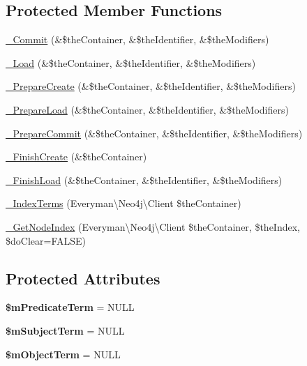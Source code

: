 \subsection*{Protected Member Functions}
\begin{DoxyCompactItemize}
\item 
\hyperlink{class_c_ontology_edge_a76e551f21dcac3c0bc228c67226bec08}{\-\_\-\-Commit} (\&\$the\-Container, \&\$the\-Identifier, \&\$the\-Modifiers)
\item 
\hyperlink{class_c_ontology_edge_ae7a4861887c1a73dcdbd0285cdba1d8d}{\-\_\-\-Load} (\&\$the\-Container, \&\$the\-Identifier, \&\$the\-Modifiers)
\item 
\hyperlink{class_c_ontology_edge_a1d09b3ef8e4ef57a072291a7c09f7371}{\-\_\-\-Prepare\-Create} (\&\$the\-Container, \&\$the\-Identifier, \&\$the\-Modifiers)
\item 
\hyperlink{class_c_ontology_edge_a6099442ba1dca683e4832d406793b5b9}{\-\_\-\-Prepare\-Load} (\&\$the\-Container, \&\$the\-Identifier, \&\$the\-Modifiers)
\item 
\hyperlink{class_c_ontology_edge_a2bea996dff6e836069d75572f9386039}{\-\_\-\-Prepare\-Commit} (\&\$the\-Container, \&\$the\-Identifier, \&\$the\-Modifiers)
\item 
\hyperlink{class_c_ontology_edge_a0956d5920484a329c77d878bb6c25784}{\-\_\-\-Finish\-Create} (\&\$the\-Container)
\item 
\hyperlink{class_c_ontology_edge_ac45af3396c797be599c2a1780b7bfa59}{\-\_\-\-Finish\-Load} (\&\$the\-Container, \&\$the\-Identifier, \&\$the\-Modifiers)
\item 
\hyperlink{class_c_ontology_edge_a7b8a93f340be66aa47e6e1e73ff326ab}{\-\_\-\-Index\-Terms} (Everyman\textbackslash{}\-Neo4j\textbackslash{}\-Client \$the\-Container)
\item 
\hyperlink{class_c_ontology_edge_ab047f9ba598226fe20c268239aacb727}{\-\_\-\-Get\-Node\-Index} (Everyman\textbackslash{}\-Neo4j\textbackslash{}\-Client \$the\-Container, \$the\-Index, \$do\-Clear=F\-A\-L\-S\-E)
\end{DoxyCompactItemize}
\subsection*{Protected Attributes}
\begin{DoxyCompactItemize}
\item 
\hypertarget{class_c_ontology_edge_a7da276bc73676096b1cef4cdbf88428b}{{\bfseries \$m\-Predicate\-Term} = N\-U\-L\-L}\label{class_c_ontology_edge_a7da276bc73676096b1cef4cdbf88428b}

\item 
\hypertarget{class_c_ontology_edge_af9c4f23f64990824355d21daf3db1a1a}{{\bfseries \$m\-Subject\-Term} = N\-U\-L\-L}\label{class_c_ontology_edge_af9c4f23f64990824355d21daf3db1a1a}

\item 
\hypertarget{class_c_ontology_edge_a2dabe441063537fdd713b6cda8064688}{{\bfseries \$m\-Object\-Term} = N\-U\-L\-L}\label{class_c_ontology_edge_a2dabe441063537fdd713b6cda8064688}

\end{DoxyCompactItemize}


